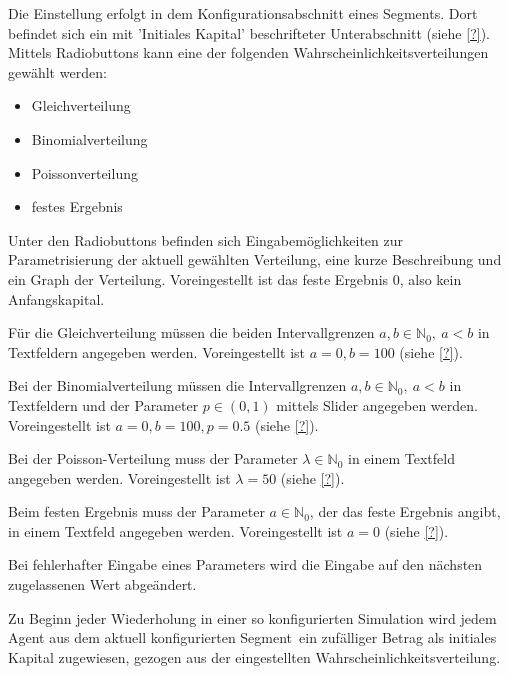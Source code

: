 \documentclass[parskip=full,11pt]{scrartcl}
\def\segment{Segment}
\begin{document}
Die Einstellung erfolgt in dem Konfigurationsabschnitt eines \segment s. Dort befindet sich ein mit 'Initiales Kapital' beschrifteter Unterabschnitt (siehe \cref{?}). Mittels Radiobuttons kann eine der folgenden Wahrscheinlichkeitsverteilungen gewählt werden:
\begin{itemize}
\item Gleichverteilung
\item Binomialverteilung
\item Poissonverteilung
\item festes Ergebnis
\end{itemize}
Unter den Radiobuttons befinden sich Eingabemöglichkeiten zur Parametrisierung der aktuell gewählten Verteilung, eine kurze Beschreibung und ein Graph der Verteilung. Voreingestellt ist das feste Ergebnis \(0\), also kein Anfangskapital.

Für die Gleichverteilung müssen die beiden Intervallgrenzen \(a,b \in \mathbb{N}_0, \ a < b\) in Textfeldern angegeben werden. Voreingestellt ist \(a = 0, b = 100\) (siehe \cref{?}).

Bei der Binomialverteilung müssen die Intervallgrenzen \(a,b \in \mathbb{N}_0, \ a < b\) in Textfeldern und der Parameter \(p \in (0,1)\) mittels Slider angegeben werden. Voreingestellt ist \(a = 0, b = 100, p = 0.5\) (siehe \cref{?}).

Bei der Poisson-Verteilung muss der Parameter \(\lambda \in \mathbb{N}_0\) in einem Textfeld angegeben werden. Voreingestellt ist \(\lambda = 50\) (siehe \cref{?}).

Beim festen Ergebnis muss der Parameter \(a \in \mathbb{N}_0\), der das feste Ergebnis angibt, in einem Textfeld angegeben werden. Voreingestellt ist \(a = 0\) (siehe \cref{?}).

Bei fehlerhafter Eingabe eines Parameters wird die Eingabe auf den nächsten zugelassenen Wert abgeändert.

Zu Beginn jeder Wiederholung in einer so konfigurierten Simulation wird jedem Agent aus dem aktuell konfigurierten \segment\ ein zufälliger Betrag als initiales Kapital zugewiesen, gezogen aus der eingestellten Wahrscheinlichkeitsverteilung.

\end{document}
